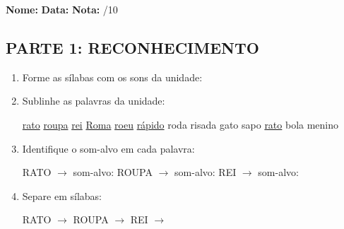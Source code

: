\begin{exercicio}

\noindent\textbf{Nome:} \underline{\hspace{3.2cm}} \quad \textbf{Data:} \underline{\hspace{1.6cm}} \quad \textbf{Nota:} \underline{\hspace{0.9cm}}/10


\subsection*{PARTE 1: RECONHECIMENTO}

\begin{enumerate}

  \item Forme as sílabas com os sons da unidade:

\begin{center}
\end{center}

  \item Sublinhe as palavras da unidade:

\begin{center}
  \uline{rato} \quad \uline{roupa} \quad \uline{rei} \quad \uline{Roma} \quad \uline{roeu} \quad \uline{rápido} \quad roda \quad risada \quad gato \quad sapo \quad \uline{rato} \quad bola \quad menino
\end{center}

  \item Identifique o som-alvo em cada palavra:
  \begin{center}
  RATO $\rightarrow$ som-alvo: \underline{\hspace{1cm}} \quad ROUPA $\rightarrow$ som-alvo: \underline{\hspace{1cm}} \quad REI $\rightarrow$ som-alvo: \underline{\hspace{1cm}}
  \end{center}

  \item Separe em sílabas:
  \begin{center}
  RATO $\rightarrow$ \underline{\hspace{1cm}} \quad ROUPA $\rightarrow$ \underline{\hspace{1cm}} \quad REI $\rightarrow$ \underline{\hspace{1cm}}
  \end{center}


\end{enumerate}
\end{exercicio}
